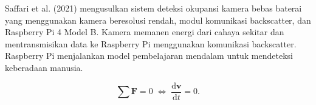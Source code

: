Saffari et al. (2021) mengusulkan sistem deteksi okupansi kamera bebas baterai yang menggunakan kamera beresolusi rendah, modul komunikasi backscatter, dan Raspberry Pi 4 Model B. Kamera memanen energi dari cahaya sekitar dan mentransmisikan data ke Raspberry Pi menggunakan komunikasi backscatter. Raspberry Pi menjalankan model pembelajaran mendalam untuk mendeteksi keberadaan manusia.


\begin{equation}
  \label{eq:hukumpertama}
  \sum \mathbf{F} = 0\; \Leftrightarrow\; \frac{\mathrm{d} \mathbf{v} }{\mathrm{d}t} = 0.
\end{equation}

\lipsum[6-7]
